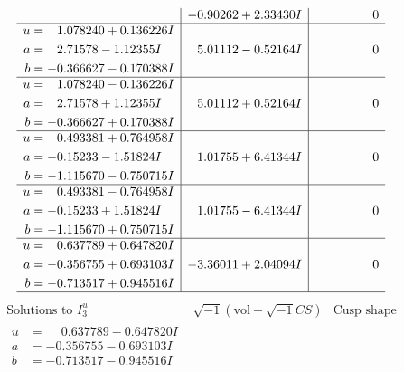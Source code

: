 \documentclass[1p]{elsarticle_modified}
\theoremstyle{definition}
\newcommand{\I}{\sqrt{-1}}
\begin{document}
$$\begin{array}{c|c|c}
 & -0.90262 + 2.33430 I & \phantom{-0.000000 } 0 \\ \hline\begin{aligned}
u &= \phantom{-}1.078240 + 0.136226 I \\
a &= \phantom{-}2.71578 - 1.12355 I \\
b &= -0.366627 - 0.170388 I\end{aligned}
 & \phantom{-}5.01112 - 0.52164 I & \phantom{-0.000000 } 0 \\ \hline\begin{aligned}
u &= \phantom{-}1.078240 - 0.136226 I \\
a &= \phantom{-}2.71578 + 1.12355 I \\
b &= -0.366627 + 0.170388 I\end{aligned}
 & \phantom{-}5.01112 + 0.52164 I & \phantom{-0.000000 } 0 \\ \hline\begin{aligned}
u &= \phantom{-}0.493381 + 0.764958 I \\
a &= -0.15233 - 1.51824 I \\
b &= -1.115670 - 0.750715 I\end{aligned}
 & \phantom{-}1.01755 + 6.41344 I & \phantom{-0.000000 } 0 \\ \hline\begin{aligned}
u &= \phantom{-}0.493381 - 0.764958 I \\
a &= -0.15233 + 1.51824 I \\
b &= -1.115670 + 0.750715 I\end{aligned}
 & \phantom{-}1.01755 - 6.41344 I & \phantom{-0.000000 } 0 \\ \hline\begin{aligned}
u &= \phantom{-}0.637789 + 0.647820 I \\
a &= -0.356755 + 0.693103 I \\
b &= -0.713517 + 0.945516 I\end{aligned}
 & -3.36011 + 2.04094 I & \phantom{-0.000000 } 0\\
 \hline 
 \end{array}$$\newpage$$\begin{array}{c|c|c}  
\text{Solutions to }I^u_{3}& \I (\text{vol} + \sqrt{-1}CS) & \text{Cusp shape}\\
 \hline 
\begin{aligned}
u &= \phantom{-}0.637789 - 0.647820 I \\
a &= -0.356755 - 0.693103 I \\
b &= -0.713517 - 0.945516 I\end{aligned}

\end{array}$$
\end{document}
